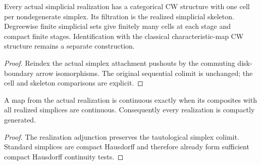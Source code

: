 \begin{proposition}
  \label{prop:realized-simplicial-cw-structure}
  \leanok
  Every actual simplicial realization has a categorical CW structure with one cell per nondegenerate simplex. Its filtration is the realized simplicial skeleton. Degreewise finite simplicial sets give finitely many cells at each stage and compact finite stages. Identification with the classical characteristic-map CW structure remains a separate construction.
\end{proposition}
\begin{proof}
  Reindex the actual simplex attachment pushouts by the commuting disk-boundary arrow isomorphisms. The original sequential colimit is unchanged; the cell and skeleton comparisons are explicit.
  \leanok
\end{proof}

\begin{proposition}
  \label{prop:realization-compactly-generated}
  \leanok
  A map from the actual realization is continuous exactly when its composites with all realized simplices are continuous. Consequently every realization is compactly generated.
\end{proposition}
\begin{proof}
  The realization adjunction preserves the tautological simplex colimit. Standard simplices are compact Hausdorff and therefore already form sufficient compact Hausdorff continuity tests.
  \leanok
\end{proof}

